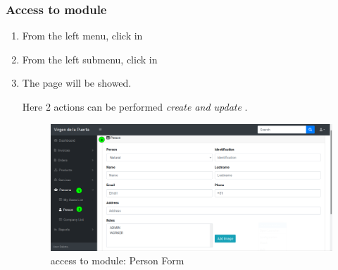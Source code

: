 \documentclass[a4paper,11pt]{refart}
\begin{document}
\subsubsection{Access to module}
\begin{enumerate}
	\item From the left menu, click in 
	\item From the left submenu, click in 
	\item The page will be showed.
	\medskip
	\begin{leftbar}
		Here 2 actions can be performed \emph{create and update} .
	\end{leftbar}
	\begin{figure}[H]\centering
		\includegraphics[width=\textwidth]{images/person_form-access.png}
		\caption{access to module: Person Form}
		\label{fig:person_form-access.png}
	\end{figure}
\end{enumerate}
\end{document}
